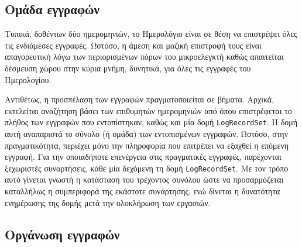 \subsection{Ομάδα εγγραφών}
Τυπικά, δοθέντων δύο ημερομηνιών, το Ημερολόγιο είναι σε θέση να επιστρέψει όλες
τις ενδιάμεσες εγγραφές. Ωστόσο, η άμεση και μαζική επιστροφή τους είναι
απαγορευτική λόγω των περιορισμένων πόρων του μικροελεγκτή καθώς απαιτείται
δέσμευση χώρου στην κύρια μνήμη, δυνητικά, για όλες τις εγγραφές του
Ημερολογίου.
%

Αντιθέτως, η προσπέλαση των εγγραφών πραγματοποιείται σε βήματα. Αρχικά,
εκτελείται αναζήτηση βάσει των επιθυμητών ημερομηνιών από όπου επιστρέφεται το
πλήθος των εγγραφών που εντοπίστηκαν, καθώς και μία δομή \verb~LogRecordSet~. H
δομή αυτή αναπαριστά το σύνολο (ή ομάδα) των εντοπισμένων εγγραφών.
Ωστόσο, στην πραγματικότητα, περιέχει μόνο την πληροφορία που επιτρέπει να
εξαχθεί η επόμενη εγγραφή.
Για την οποιαδήποτε επενέργεια στις πραγματικές εγγραφές, παρέχονται ξεχωριστές
συναρτήσεις, κάθε μία δεχόμενη τη δομή \verb~LogRecordSet~. Με τον τρόπο αυτό
γίνεται γνωστή η κατάσταση του τρέχοντος συνόλου ώστε να προσαρμόζεται
καταλλήλως η συμπεριφορά της εκάστοτε συνάρτησης, ενώ δίνεται η δυνατότητα
ενημέρωσης της δομής μετά την ολοκλήρωση των εργασιών.



\subsection{Οργάνωση εγγραφών}

